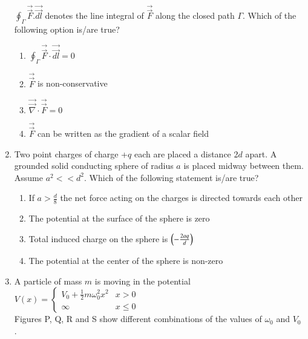 \documentclass[journal]{IEEEtran}
\begin{document}
\begin{enumerate}
$\oint_\Gamma \Vec{\overrightarrow{F}}.\Vec{\overrightarrow{dl}}$ denotes the line integral of $\Vec{\overrightarrow{F}}$ along the closed path $\Gamma$. Which of the following option is/are true?
\begin{enumerate}
    \item $\oint_\Gamma \Vec{\overrightarrow{F}}\cdot\Vec{\overrightarrow{dl}}=0$
    \item $\Vec{\overrightarrow{F}}$ is non-conservative
    \item $\Vec{\overrightarrow{\nabla}}\cdot\Vec{\overrightarrow{F}}=0$
    \item  $\Vec{\overrightarrow{F}}$ can be written as the gradient of a scalar field
\end{enumerate}
\item Two point charges of charge +$q$ each are placed a distance 2$d$ apart. A grounded
solid conducting sphere of radius $a$ is placed midway between them.
Assume $a^2<<d^2$. Which of the following statement is/are true?
\begin{enumerate}
    \item  If $a>\frac{d}{8}$ the net force acting on the charges is directed towards each other
    \item The potential at the surface of the sphere is zero
    \item Total induced charge on the sphere is $\left(-\frac{2aq}{d}\right)$
    \item The potential at the center of the sphere is non-zero
\end{enumerate}
\item A particle of mass $m$ is moving in the potential  \\
  $ V(x)= \begin{cases} V_0+\frac{1}{2}m\omega_0^2x^2 & x>0 \\ \infty & x\leq0 \end{cases}$ \\
Figures P, Q, R and S show different combinations of the values of $\omega_0$ and $V_0$ . \\ 
\begin{figure}[H]
    \centering
    \resizebox{0.7\textwidth}{!}{}
\end{figure}


\end{enumerate}
\end{document}
